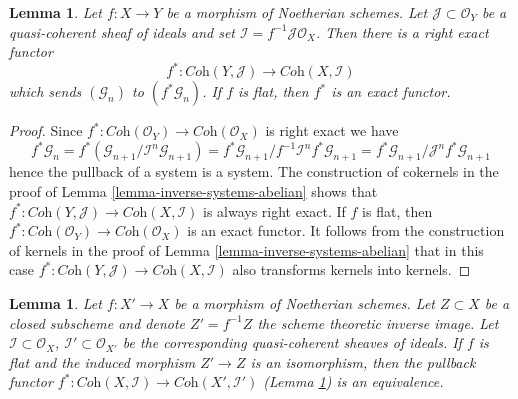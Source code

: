 \documentclass{stacks-project}
\theoremstyle{plain}
\newtheorem{lemma}[subsection]{Lemma}
\theoremstyle{definition}
\theoremstyle{remark}
\numberwithin{equation}{subsection}
\begin{document}
\begin{lemma}
\label{lemma-inverse-systems-pullback}
Let $f : X \to Y$ be a morphism of Noetherian schemes.
Let $\mathcal{J} \subset \mathcal{O}_Y$ be a quasi-coherent sheaf
of ideals and set $\mathcal{I} = f^{-1}\mathcal{J} \mathcal{O}_X$.
Then there is a right exact functor
$$
f^* : \textit{Coh}(Y, \mathcal{J}) \longrightarrow \textit{Coh}(X, \mathcal{I})
$$
which sends $(\mathcal{G}_n)$ to $(f^*\mathcal{G}_n)$. If $f$ is flat,
then $f^*$ is an exact functor.
\end{lemma}

\begin{proof}
Since $f^* : \textit{Coh}(\mathcal{O}_Y) \to \textit{Coh}(\mathcal{O}_X)$
is right exact we have
$$
f^*\mathcal{G}_n =
f^*(\mathcal{G}_{n + 1}/\mathcal{I}^n\mathcal{G}_{n + 1}) =
f^*\mathcal{G}_{n + 1}/f^{-1}\mathcal{I}^nf^*\mathcal{G}_{n + 1} =
f^*\mathcal{G}_{n + 1}/\mathcal{J}^nf^*\mathcal{G}_{n + 1}
$$
hence the pullback of a system is a system. The construction of
cokernels in the proof of Lemma \ref{lemma-inverse-systems-abelian}
shows that
$f^* : \textit{Coh}(Y, \mathcal{J}) \to \textit{Coh}(X, \mathcal{I})$
is always right exact. If $f$ is flat, then
$f^* : \textit{Coh}(\mathcal{O}_Y) \to \textit{Coh}(\mathcal{O}_X)$
is an exact functor. It follows from the construction of kernels
in the proof of Lemma \ref{lemma-inverse-systems-abelian}
that in this case
$f^* : \textit{Coh}(Y, \mathcal{J}) \to \textit{Coh}(X, \mathcal{I})$
also transforms kernels into kernels.
\end{proof}

\begin{lemma}
\label{lemma-inverse-systems-pullback-equivalence}
Let $f : X' \to X$ be a morphism of Noetherian schemes. Let $Z \subset X$
be a closed subscheme and denote $Z' = f^{-1}Z$ the scheme theoretic
inverse image. Let $\mathcal{I} \subset \mathcal{O}_X$,
$\mathcal{I}' \subset \mathcal{O}_{X'}$ be the corresponding
quasi-coherent sheaves of ideals.
If $f$ is flat and the induced morphism $Z' \to Z$
is an isomorphism, then the pullback functor
$f^* : \textit{Coh}(X, \mathcal{I}) \to \textit{Coh}(X', \mathcal{I}')$
(Lemma \ref{lemma-inverse-systems-pullback})
is an equivalence.
\end{lemma}
\end{document}
